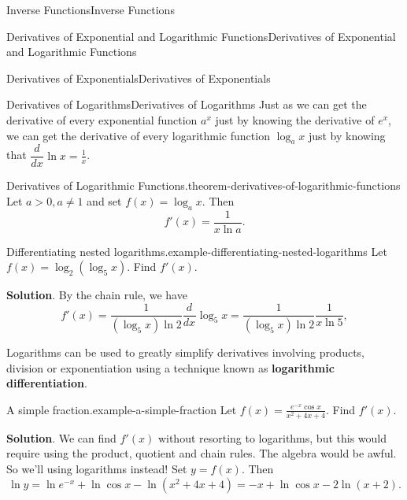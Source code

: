 \documentclass[10pt,]{book}
\newcommand{\terminology}[1]{\textbf{#1}}
\numberwithin{equation}{section}
\newcommand{\dv}[3][]{\dfrac{d^{#1} #2}{d #3^{#1}}}
\begin{document}
\begin{chapterptx}{Inverse Functions}{}{Inverse Functions}{}{}
\begin{sectionptx}{Derivatives of Exponential and Logarithmic Functions}{}{Derivatives of Exponential and Logarithmic Functions}{}{}
\begin{subsectionptx}{Derivatives of Exponentials}{}{Derivatives of Exponentials}{}{}
\end{subsectionptx}
%
%
\typeout{************************************************}
\typeout{************************************************}
%
\begin{subsectionptx}{Derivatives of Logarithms}{}{Derivatives of Logarithms}{}{}\label{subsection-derivatives-of-logarithms}
\hypertarget{p-235}{}%
Just as we can get the derivative of every exponential function \(a^{x}\) just by knowing the derivative of \(e^{x}\), we can get the derivative of every logarithmic function \(\log_{a}x\) just by knowing that \(\dv{}{x}\ln x = \frac{1}{x}\).%
\begin{theorem}{Derivatives of Logarithmic Functions.}{}{theorem-derivatives-of-logarithmic-functions}%
\hypertarget{p-236}{}%
Let \(a > 0, a\neq 1\) and set \(f(x) = \log_{a}x\). Then%
\begin{equation*}
f'(x) = \frac{1}{x\ln a}.
\end{equation*}
%
\end{theorem}
\begin{example}{Differentiating nested logarithms.}{example-differentiating-nested-logarithms}%
\hypertarget{p-237}{}%
Let \(f(x) = \log_{2}(\log_{5} x)\). Find \(f'(x)\).%
\par\smallskip%
\noindent\textbf{Solution}.\hypertarget{solution-51}{}\quad%
\hypertarget{p-238}{}%
By the chain rule, we have%
\begin{equation*}
f'(x) = \frac{1}{(\log_{5}x)\ln 2}\dv{}{x}\log_{5}x = \frac{1}{(\log_{5} x)\ln 2}\frac{1}{x\ln 5},
\end{equation*}
%
\end{example}
\hypertarget{p-239}{}%
Logarithms can be used to greatly simplify derivatives involving products, division or exponentiation using a technique known as \terminology{logarithmic differentiation}.%
\begin{example}{A simple fraction.}{example-a-simple-fraction}%
\hypertarget{p-240}{}%
Let \(f(x) = \frac{e^{-x}\cos x}{x^{2} + 4x + 4}\). Find \(f'(x)\).%
\par\smallskip%
\noindent\textbf{Solution}.\hypertarget{solution-52}{}\quad%
\hypertarget{p-241}{}%
We can find \(f'(x)\) without resorting to logarithms, but this would require using the product, quotient and chain rules. The algebra would be awful. So we'll using logarithms instead! Set \(y = f(x)\). Then%
\begin{equation*}
\ln y = \ln e^{-x} + \ln\cos x - \ln (x^{2} + 4x + 4) = -x + \ln\cos x - 2\ln(x+2).

\end{equation*}
\end{example}
\end{subsectionptx}
\end{sectionptx}
\end{chapterptx}
\end{document}
